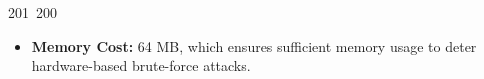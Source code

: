 201~200~\documentclass{article}
\begin{document}
	                                                                                                                                                                                                                                                                                                	                                                                                                                                        	    	                                                                                                	                                                                                                                                                                                                                                                                                                                                	                                                                        	                                                                        	                                                                                    \begin{itemize}
	                                                                                                                                                                                                                                                                                                	                                                                                                                                        	    	                                                                                                	                                                                                                                                                                                                                                                                                                                                	                                                                        	                                                                        	                                                                                        \item \textbf{Memory Cost:} 64 MB, which ensures sufficient memory usage to deter hardware-based brute-force attacks.

\end{itemize}
\end{document}
